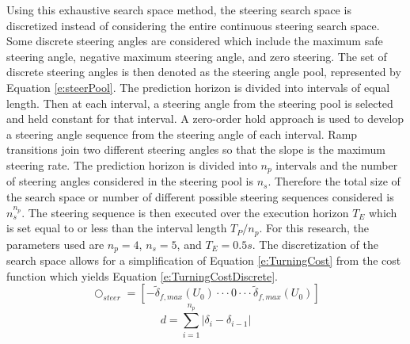 \documentclass[12pt,onecolumn]{report}
\begin{document}
Using this exhaustive search space method, the steering search space is discretized instead of considering the entire continuous steering search space. Some discrete steering angles are considered which include the maximum safe steering angle, negative maximum steering angle, and zero steering. The set of discrete steering angles is then denoted as the steering angle pool, represented by Equation \eqref{e:steerPool}. The prediction horizon is divided into intervals of equal length. Then at each interval, a steering angle from the steering pool is selected and held constant for that interval. A zero-order hold approach is used to develop a steering angle sequence from the steering angle of each interval. Ramp transitions join two different steering angles so that the slope is the maximum steering rate. The prediction horizon is divided into $n_p$ intervals and the number of steering angles considered in the steering pool is $n_s$. Therefore the total size of the search space or number of different possible steering sequences considered is $n_s^{n_p}$. The steering sequence is then executed over the execution horizon $T_E$ which is set equal to or less than the interval length $T_P/n_p$. For this research, the parameters used are $n_p = 4$, $n_s=5$, and $T_E = 0.5s$. The discretization of the search space allows for a simplification of Equation \eqref{e:TurningCost} from the cost function which yields Equation \eqref{e:TurningCostDiscrete}.
%
\begin{equation}\label{e:steerPool}
\bigcirc_{steer}=[ -\tilde{\delta}_{f,max}\left(U_0\right)\cdot\cdot\cdot 0 \cdot\cdot\cdot \tilde{\delta}_{f,max}\left(U_0\right) ]
\end{equation}
\begin{equation}\label{e:TurningCostDiscrete}
d = \sum\limits_{i=1}^{n_p}|\delta_i -\delta_{i-1}|
\end{equation}
\end{document}
